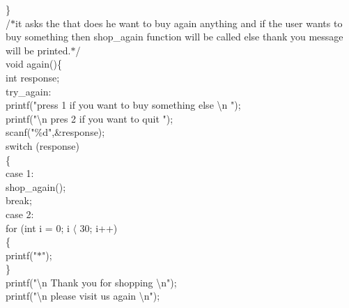 \documentclass[10pt,a4paper]{article}
\begin{document}
\begin{flushleft}
\}\\
/$\ast$it asks the that does he want to buy again anything and if the user wants to buy something then shop\_again 
function will be called else thank you message will be printed.$\ast$/\\
void again()\{\\
    \hspace*{0.5cm}  int response;\\
    \hspace*{0.5cm}  try\_again:\\
    \hspace*{0.5cm}  printf("press 1 if you want to buy something else \textbackslash n ");\\
    \hspace*{0.5cm}  printf("\textbackslash n pres 2 if you want to quit ");\\
    \hspace*{0.5cm}  scanf("\%d",\&response);\\
    \hspace*{0.5cm}  switch (response)\\
    \hspace*{0.5cm}  \{\\
    \hspace*{0.5cm}  case 1:\\
    \hspace*{0.5cm}  \hspace*{0.5cm}   shop\_again();\\
    \hspace*{0.5cm}  \hspace*{0.5cm}   break;\\
    \hspace*{0.5cm}  case 2:\\
    \hspace*{0.5cm}  for (int i = 0; i $\langle$ 30; i++)\\
    \hspace*{0.5cm}  \{\\
    \hspace*{0.5cm}  \hspace*{0.5cm}       printf("$\ast$");\\
    \hspace*{0.5cm}  \}\\
    \hspace*{0.5cm}  printf("\textbackslash n Thank you for shopping \textbackslash n");\\
    \hspace*{0.5cm}  printf("\textbackslash n please visit us again \textbackslash n");\\

\end{flushleft}
\end{document}
